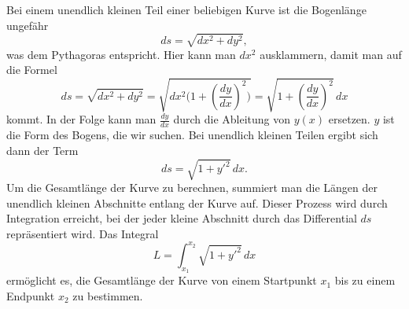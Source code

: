Bei einem unendlich kleinen Teil einer beliebigen Kurve ist die Bogenlänge ungefähr
\begin{equation}
	ds
	=
	\sqrt{dx^2 + dy^2}
	\label{kettenlinie:equation1},
\end{equation}
was dem Pythagoras entspricht.
Hier kann man \(dx^2\) ausklammern, damit man auf die Formel
\begin{equation}
	ds
	=
	\sqrt{dx^2 + dy^2}
	=
	\sqrt{dx^2 \biggl( 1 + \left( \frac{dy}{dx} \right)^2 \biggr)}
	=
	\sqrt{1 + \left( \frac{dy}{dx} \right)^2} \, dx
\end{equation}
kommt.
In der Folge kann man \(\frac{dy}{dx}\) durch die Ableitung von \(y(x)\) ersetzen.
\(y\) ist die Form des Bogens, die wir suchen.
Bei unendlich kleinen Teilen ergibt sich dann der Term
\begin{equation}
	ds
	=
	\sqrt{1 + y'^2} \, dx.
\end{equation}
Um die Gesamtlänge der Kurve zu berechnen, summiert man die Längen der unendlich kleinen Abschnitte entlang der Kurve auf.
Dieser Prozess wird durch Integration erreicht, bei der jeder kleine Abschnitt durch das Differential \(ds\) repräsentiert wird.
Das Integral
\begin{equation}
	L
	=
	\int_{x_1}^{x_2} \sqrt{1 + y'^2} \, dx
\end{equation}
ermöglicht es, die Gesamtlänge der Kurve von einem Startpunkt \(x_1\) bis zu einem Endpunkt \(x_2\) zu bestimmen.

